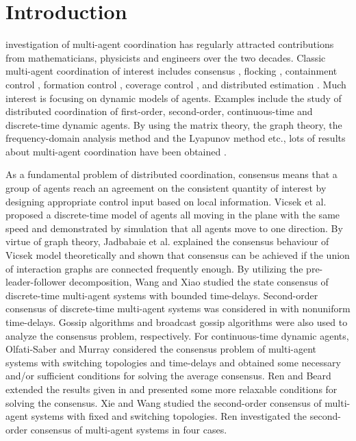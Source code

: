 \documentclass[12pt,draftcls,onecolumn]{IEEEtran}
\begin{document}
\section{Introduction}\label{s-introduction}

 investigation of multi-agent coordination has regularly attracted contributions from mathematicians, physicists and engineers over the two decades. Classic multi-agent coordination of interest includes consensus \cite{Olfati-Saber07}, flocking \cite{Saber06}, containment control \cite{cao11},  formation control \cite{xiao09}, coverage control \cite{cortes02}, and distributed estimation \cite{yang2008}. Much interest is focusing on dynamic models of agents. Examples include the study of distributed coordination of first-order, second-order, continuous-time and discrete-time dynamic agents. By using the matrix theory, the graph theory, the frequency-domain analysis method and the Lyapunov method etc., lots of results about multi-agent coordination have been obtained \cite{Renbook08,Xiao08-1,ji09,su14}.

As a fundamental problem of distributed coordination, consensus means that a group of agents reach an agreement on the consistent quantity of interest by designing appropriate control input based on local information. Vicsek et al. \cite{vicsek95} proposed a discrete-time model of  agents all moving in the plane with the same speed and demonstrated by simulation that all agents move to one direction. By virtue of graph theory, Jadbabaie et al. \cite{jabdabaie03} explained the consensus behaviour of Vicsek model theoretically and shown that consensus can be achieved if the union of interaction graphs are connected frequently enough. By utilizing the pre-leader-follower decomposition, Wang and Xiao \cite{xiao06-1} studied the state consensus of discrete-time multi-agent systems with bounded time-delays. Second-order consensus of discrete-time multi-agent systems was considered in \cite{lin09} with nonuniform time-delays. Gossip algorithms \cite{boyd06} and broadcast gossip algorithms \cite{aysal09} were also used to analyze the consensus problem, respectively. For continuous-time dynamic agents, Olfati-Saber and Murray \cite{sabertac04} considered the consensus problem of multi-agent systems with switching topologies and time-delays and obtained some necessary and/or sufficient conditions for solving the average consensus. Ren and Beard \cite{ren05} extended the results given in \cite{sabertac04} and presented some more relaxable conditions for solving the consensus. Xie and Wang \cite{Xie07} studied the second-order consensus of multi-agent systems with fixed and switching topologies. Ren \cite{Ren08} investigated the second-order consensus of multi-agent systems in four cases.
\end{document}

